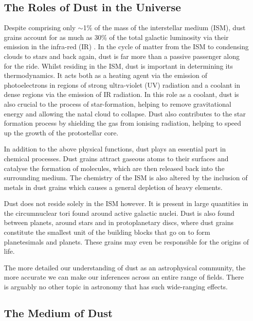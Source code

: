 \subsection{The Roles of Dust in the Universe}

Despite comprising only $\sim$1\% of the mass of the interstellar medium (ISM), dust grains account for as much as 30\% of the total galactic luminosity via their emission in the infra-red (IR) \citep{Li2003}.  In the cycle of matter from the ISM to condensing clouds to stars and back again, dust is far more than a passive passenger along for the ride.  Whilst residing in the ISM, dust is important in determining its thermodynamics.  It acts both as a heating agent via the emission of photoelectrons in regions of strong ultra-violet (UV) radiation and a coolant in dense regions via the emission of IR radiation.  In this role as a coolant, dust is also crucial to the process of star-formation, helping to remove gravitational energy and allowing the natal cloud to collapse.  Dust also contributes to the star formation process by shielding the gas from ionising radiation, helping to speed up the growth of the protostellar core. 

In addition to the above physical functions, dust plays an essential part in chemical processes.  Dust grains  attract gaseous atoms to their surfaces and catalyse the formation of molecules, which are then released back into the surrounding medium.  The chemistry of the ISM is also altered by the inclusion of metals in dust grains which causes a general depletion of heavy elements.

Dust does not reside solely in the ISM however.  It is present in  large quantities in the circumnuclear tori found around active galactic nuclei.  Dust is also found between planets, around stars and in protoplanetary discs, where dust grains constitute the smallest unit of the building blocks that  go on to form planetesimals and planets.  These grains may even be responsible for the origins of life.  

The more detailed our understanding of dust as an astrophysical community, the more accurate we can make our inferences across an entire range of  fields.  There is arguably no other topic in astronomy that has such wide-ranging effects.


\subsection{The Medium of Dust}
\label{scn:dust_med}

